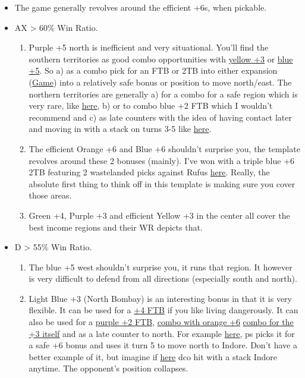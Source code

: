 \begin{itemize}
    \item The game generally revolves around the efficient +6s, when pickable.
    \item AX > 60\% Win Ratio. 
    \begin{enumerate}
        \item Purple +5 north is inefficient and very situational. You'll find the southern territories as good combo opportunities with \href{https://www.warzone.com/MultiPlayer?GameID=34620809}{yellow +3} or \href{https://www.warzone.com/MultiPlayer?GameID=36544268}{blue +5}. So a) as a combo pick for an FTB or 2TB into either expansion (\href{https://www.warzone.com/MultiPlayer?GameID=38099991}{Game}) into a relatively safe bonus or position to move north/east. The northern territories are generally a) for a combo for a safe region which is very rare, like \href{https://www.warzone.com/MultiPlayer?GameID=34314812}{here}, b) or to combo blue +2 FTB which I wouldn't recommend and c) as late counters with the idea of having contact later and moving in with a stack on turns 3-5 like \href{https://www.warzone.com/MultiPlayer?GameID=26183338}{here}.
        \item The efficient Orange +6 and Blue +6 shouldn't surprise you, the template revolves around these 2 bonuses (mainly). I've won with a triple blue +6 2TB featuring 2 wastelanded picks against Rufus \href{https://www.warzone.com/MultiPlayer?GameID=40543906}{here}. Really, the absolute first thing to think off in this template is making sure you cover those areas. 
        \item Green +4, Purple +3 and efficient Yellow +3 in the center all cover the best income regions and their WR depicts that.
    \end{enumerate}
    \item D > 55\% Win Ratio.
    \begin{enumerate}
        \item The blue +5 west shouldn't surprise you, it runs that region. It however is very difficult to defend from all directions (especially south and north).
        \item Light Blue +3 (North Bombay) is an interesting bonus in that it is very flexible. It can be used for a \href{https://www.warzone.com/MultiPlayer?GameID=33267988}{+4 FTB} if you like living dangerously. It can also be used for a \href{https://www.warzone.com/MultiPlayer?GameID=34086327}{purple +2 FTB}, \href{https://www.warzone.com/MultiPlayer?GameID=38248903}{combo with orange +6} \href{https://www.warzone.com/MultiPlayer?GameID=29469046}{combo for the +3 itself} and as a late counter to north. For example \href{https://www.warzone.com/MultiPlayer?GameID=40170077}{here}, ps picks it for a safe +6 bonus and uses it turn 5 to move north to Indore. Don't have a better example of it, but imagine if \href{https://www.warzone.com/MultiPlayer?GameID=33083890}{here} dco hit with a stack Indore anytime. The opponent's position collapses.

\end{enumerate}
\end{itemize}
